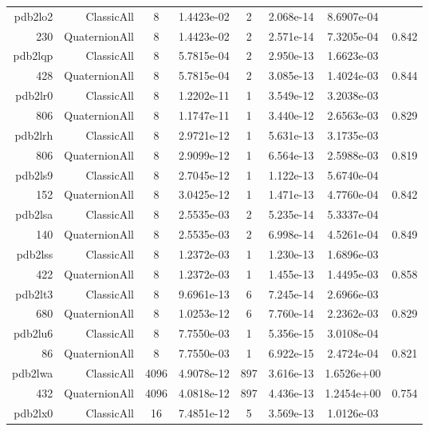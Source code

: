 \begin{xltabular}{\textwidth}{r|rcS[table-format=1.4e+2]cS[table-format=1.3e+2]S[table-format=1.4e+2]S[table-format=-1.3]}
pdb2lo2 & ClassicAll & 8 & 1.4423e-02 & 2 & 2.068e-14 & 8.6907e-04 & \\
230 & QuaternionAll & 8 & 1.4423e-02 & 2 & 2.571e-14 & 7.3205e-04 & 0.842\\  \addlinespace
pdb2lqp & ClassicAll & 8 & 5.7815e-04 & 2 & 2.950e-13 & 1.6623e-03 & \\
428 & QuaternionAll & 8 & 5.7815e-04 & 2 & 3.085e-13 & 1.4024e-03 & 0.844\\  \addlinespace
pdb2lr0 & ClassicAll & 8 & 1.2202e-11 & 1 & 3.549e-12 & 3.2038e-03 & \\
806 & QuaternionAll & 8 & 1.1747e-11 & 1 & 3.440e-12 & 2.6563e-03 & 0.829\\  \addlinespace
pdb2lrh & ClassicAll & 8 & 2.9721e-12 & 1 & 5.631e-13 & 3.1735e-03 & \\
806 & QuaternionAll & 8 & 2.9099e-12 & 1 & 6.564e-13 & 2.5988e-03 & 0.819\\  \addlinespace
pdb2ls9 & ClassicAll & 8 & 2.7045e-12 & 1 & 1.122e-13 & 5.6740e-04 & \\
152 & QuaternionAll & 8 & 3.0425e-12 & 1 & 1.471e-13 & 4.7760e-04 & 0.842\\  \addlinespace
pdb2lsa & ClassicAll & 8 & 2.5535e-03 & 2 & 5.235e-14 & 5.3337e-04 & \\
140 & QuaternionAll & 8 & 2.5535e-03 & 2 & 6.998e-14 & 4.5261e-04 & 0.849\\  \addlinespace
pdb2lss & ClassicAll & 8 & 1.2372e-03 & 1 & 1.230e-13 & 1.6896e-03 & \\
422 & QuaternionAll & 8 & 1.2372e-03 & 1 & 1.455e-13 & 1.4495e-03 & 0.858\\  \addlinespace
pdb2lt3 & ClassicAll & 8 & 9.6961e-13 & 6 & 7.245e-14 & 2.6966e-03 & \\
680 & QuaternionAll & 8 & 1.0253e-12 & 6 & 7.760e-14 & 2.2362e-03 & 0.829\\  \addlinespace
pdb2lu6 & ClassicAll & 8 & 7.7550e-03 & 1 & 5.356e-15 & 3.0108e-04 & \\
86 & QuaternionAll & 8 & 7.7550e-03 & 1 & 6.922e-15 & 2.4724e-04 & 0.821\\  \addlinespace
{\color{red} pdb2lwa } & ClassicAll & 4096 & 4.9078e-12 & 897 & 3.616e-13 & 1.6526e+00 & \\
432 & QuaternionAll & 4096 & 4.0818e-12 & 897 & 4.436e-13 & 1.2454e+00 & 0.754\\  \addlinespace
pdb2lx0 & ClassicAll & 16 & 7.4851e-12 & 5 & 3.569e-13 & 1.0126e-03 & \\

\end{xltabular}
